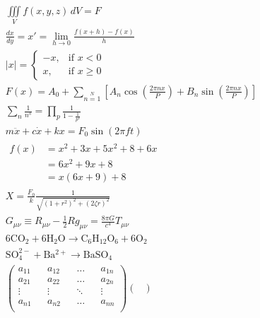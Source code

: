 \documentclass{article}
\begin{document}
    \thispagestyle{empty}
    \begin{gather*}
        \iiint \limits_V f(x,y,z)\, dV = F\\
        \frac{dx}{dy} = x' = \lim_{h \to 0}\frac{f\left(x+h\right)-f\left(x\right)}{h}\\ 
        |x| =
        \begin{cases}
            -x,& \text{if }x < 0\\
            x,& \text{if }x\geq 0
        \end{cases}\\
        F(x) = A_0 + \sum\limits_{n=1}\limits^N \left[A_n \cos\left(\frac{2\pi nx}{P}\right) + B_n \sin\left(\frac{2\pi nx}{P}\right)\right]\\
        \sum \limits_n \frac{1}{n^s} = \prod \limits_p \frac{1}{1 - \frac{1}{p^s}}\\
        m\ddot{x} + c\dot{x} + kx = F_0 \sin(2\pi ft)\\
        \begin{split}
            f(x) &= x^2 + 3x + 5x^2 + 8 + 6x\\
            &= 6x^2 + 9x + 8\\
            &= x(6x+9) + 8
        \end{split}\\
        X = \frac{F_0}{k} \frac{1}{\sqrt{(1+r^2)^2 + (2\zeta r)^2}}\\
        G_{\mu\nu} \equiv R_{\mu\nu} - \frac{1}{2}Rg_{\mu\nu} = 
        \frac{8\pi G}{c^4}T_{\mu\nu}\\
        \mathrm{6CO_2 + 6H_2O \rightarrow C_6H_{12}O_6 + 6O_2}\\
        \mathrm{SO^{2-}_4 + Ba^{2+} \rightarrow BaSO_4}\\
        \begin{pmatrix}
            a_{11}&&a_{12}&&\dots&&a_{1n}\\
            a_{21}&&a_{22}&&\dots&&a_{2n}\\
            \vdots&&\vdots&&\ddots&&\vdots\\
            a_{n1}&&a_{n2}&&\dots&&a_{nn}\\
        \end{pmatrix}
        \begin{pmatrix}

\end{pmatrix}
\end{gather*}
\end{document}
